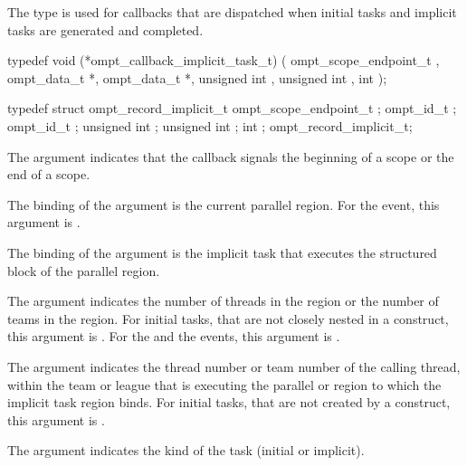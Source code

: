 \summary
The  type is used for callbacks that are 
dispatched when initial tasks and implicit tasks are generated and completed.

\format
\begin{ccppspecific}
\begin{omptCallback}
typedef void (*ompt_callback_implicit_task_t) (
  ompt_scope_endpoint_t ,
  ompt_data_t *,
  ompt_data_t *,
  unsigned int ,
  unsigned int ,
  int 
);
\end{omptCallback}
\end{ccppspecific}

\record
\begin{ccppspecific}
\begin{omptRecord}
typedef struct ompt_record_implicit_t {
  ompt_scope_endpoint_t ;
  ompt_id_t ;
  ompt_id_t ;
  unsigned int ;
  unsigned int ;
  int ;
} ompt_record_implicit_t;
\end{omptRecord}
\end{ccppspecific}

\argdesc
The  argument indicates that the callback signals
the beginning of a scope or the end of a scope.

The binding of the  argument is the current parallel 
region. For the  event, this argument is .

The binding of the  argument is the implicit task that
executes the structured block of the parallel region.

The  argument indicates the number of threads in 
the  region or the number of teams in the  region.
For initial tasks, that are not closely nested in a  construct, 
this argument is . For the  and the 
 events, this argument is .

The  argument indicates the thread number or team number of the 
calling thread, within the team or league that is executing the parallel or 
 region to which the implicit task region binds. For initial tasks, 
that are not created by a  construct, this argument is .

The  argument indicates the kind of the task (initial or implicit).

